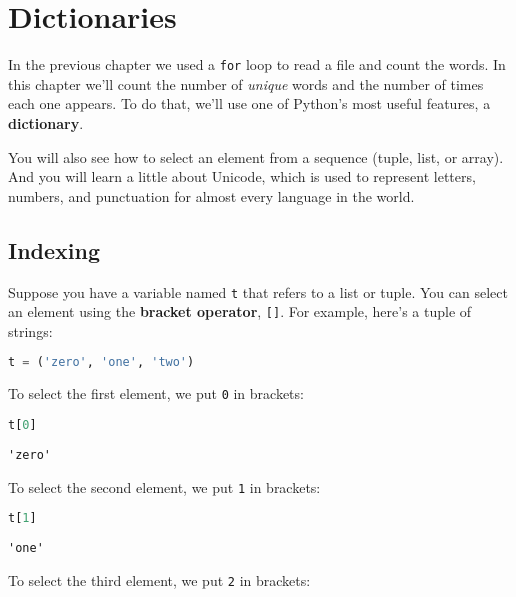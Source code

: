 \chapter{Dictionaries}\label{dictionaries}

In the previous chapter we used a \passthrough{\lstinline!for!} loop to
read a file and count the words. In this chapter we'll count the number
of \emph{unique} words and the number of times each one appears. To do
that, we'll use one of Python's most useful features, a
\textbf{dictionary}.

You will also see how to select an element from a sequence (tuple, list,
or array). And you will learn a little about Unicode, which is used to
represent letters, numbers, and punctuation for almost every language in
the world.

\section{Indexing}\label{indexing}

Suppose you have a variable named \passthrough{\lstinline!t!} that
refers to a list or tuple. You can select an element using the
\textbf{bracket operator}, \passthrough{\lstinline![]!}. For example,
here's a tuple of strings:

\begin{lstlisting}[language=Python,style=source]
t = ('zero', 'one', 'two')
\end{lstlisting}

To select the first element, we put \passthrough{\lstinline!0!} in
brackets:

\begin{lstlisting}[language=Python,style=source]
t[0]
\end{lstlisting}

\begin{lstlisting}[style=output]
'zero'
\end{lstlisting}

\pagebreak

To select the second element, we put \passthrough{\lstinline!1!} in
brackets:

\begin{lstlisting}[language=Python,style=source]
t[1]
\end{lstlisting}

\begin{lstlisting}[style=output]
'one'
\end{lstlisting}

To select the third element, we put \passthrough{\lstinline!2!} in
brackets:

